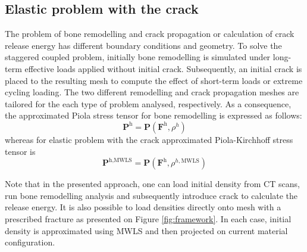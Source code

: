 \documentclass[11pt]{acmeArticle}
\numberwithin{equation}{section}
\begin{document}
\subsection{Elastic problem with the crack}

The problem of bone remodelling and crack propagation or calculation of crack
release energy has different boundary conditions and geometry. 
To solve the staggered coupled problem, initially bone remodelling is simulated under 
long-term effective loads applied without initial crack. Subsequently, an 
initial crack is placed to the resulting mesh to compute the effect 
of short-term loads or extreme cycling loading. The two different remodelling and crack propagation 
meshes are tailored for the each type of problem analysed, respectively. As
a consequence, the approximated Piola stress tensor for bone
remodelling is expressed as follows:
\begin{equation}
	\mathbf{P}^\textrm{h} = 
		\mathbf{P}(\mathbf{F}^\textrm{h}, \rho^h)
\end{equation}
whereas for elastic problem with the crack approximated Piola-Kirchhoff stress tensor is
\begin{equation}
	\mathbf{P}^{\textrm{h},\textrm{MWLS}} = 
		\mathbf{P}(
		\mathbf{F}^\textrm{h}, \rho^{h,\textrm{MWLS}})
\end{equation}

Note that in the presented approach, one can load initial density from CT
scans, run bone remodelling analysis and subsequently introduce crack to calculate the 
release energy. It is also possible to load densities directly onto mesh with a prescribed fracture as presented on Figure \ref{fig:framework}.
In each case, initial density is approximated using MWLS and then projected on current 
material configuration.
\end{document}
